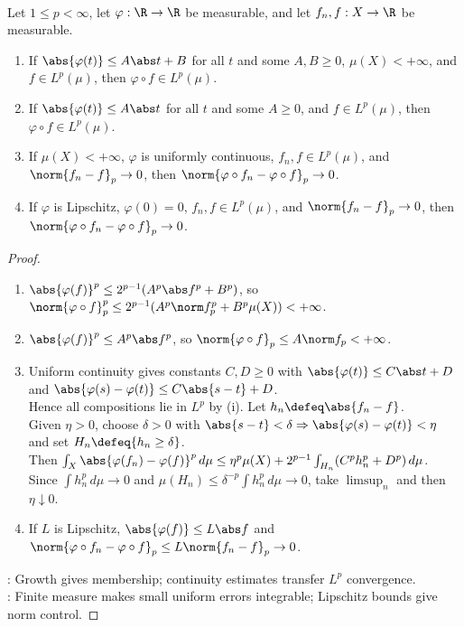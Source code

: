 \begin{proposition} \label{prop:lp-composition-growth-and-continuity} \\
Let $1\leq p<\infty$, let $\varphi:\R\to\R$ be measurable, and let $f_n,f:X\to\R$ be measurable.
\begin{enumerate}[label=(\roman*)]
\setlength{\itemsep}{0pt}
\item If $\abs{\varphi(t)}\leq A\abs t+B$ for all $t$ and some $A,B\geq0$, $\mu(X)<+\infty$, and $f\in L^p(\mu)$, then $\varphi\circ f\in L^p(\mu)$.
\item If $\abs{\varphi(t)}\leq A\abs t$ for all $t$ and some $A\geq0$, and $f\in L^p(\mu)$, then $\varphi\circ f\in L^p(\mu)$.
\item If $\mu(X)<+\infty$, $\varphi$ is uniformly continuous, $f_n,f\in L^p(\mu)$, and $\norm{f_n-f}_p\to0$, then $\norm{\varphi\circ f_n-\varphi\circ f}_p\to0$.
\item If $\varphi$ is Lipschitz, $\varphi(0)=0$, $f_n,f\in L^p(\mu)$, and $\norm{f_n-f}_p\to0$, then $\norm{\varphi\circ f_n-\varphi\circ f}_p\to0$.
\end{enumerate}
\begin{proof}
\begin{enumerate}[label=(\roman*)]
\setlength{\itemsep}{0pt}
\item $\abs{\varphi(f)}^p\leq2^{p-1}(A^p\abs f^p+B^p)$, so $\norm{\varphi\circ f}_p^p\leq2^{p-1}(A^p\norm f_p^p+B^p\mu(X))<+\infty$.
\item $\abs{\varphi(f)}^p\leq A^p\abs f^p$, so $\norm{\varphi\circ f}_p\leq A\norm f_p<+\infty$.
\item Uniform continuity gives constants $C,D\geq0$ with $\abs{\varphi(t)}\leq C\abs t+D$ and $\abs{\varphi(s)-\varphi(t)}\leq C\abs{s-t}+D$.\\
Hence all compositions lie in $L^p$ by (i). Let $h_n\defeq\abs{f_n-f}$.\\
Given $\eta>0$, choose $\delta>0$ with $\abs{s-t}<\delta\Rightarrow\abs{\varphi(s)-\varphi(t)}<\eta$ and set $H_n\defeq\{h_n\geq\delta\}$.\\
Then $\int_X\abs{\varphi(f_n)-\varphi(f)}^p\,d\mu\leq\eta^p\mu(X)+2^{p-1}\int_{H_n}(C^ph_n^p+D^p)\,d\mu$.\\
Since $\int h_n^p\,d\mu\to0$ and $\mu(H_n)\leq\delta^{-p}\int h_n^p\,d\mu\to0$, take $\limsup_n$ and then $\eta\downarrow0$.
\item If $L$ is Lipschitz, $\abs{\varphi(f)}\leq L\abs f$ and $\norm{\varphi\circ f_n-\varphi\circ f}_p\leq L\norm{f_n-f}_p\to0$.
\end{enumerate}
: Growth gives membership; continuity estimates transfer $L^p$ convergence.\\
: Finite measure makes small uniform errors integrable; Lipschitz bounds give norm control.
\end{proof}
\end{proposition}

